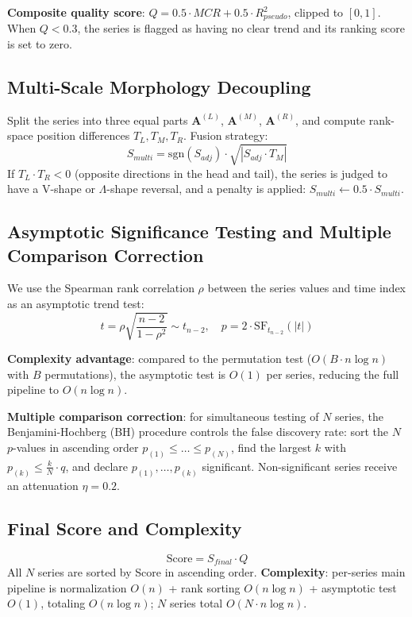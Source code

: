 \documentclass[11pt]{article}
\begin{document}
\textbf{Composite quality score}: $Q = 0.5 \cdot MCR + 0.5 \cdot R^2_{pseudo}$, clipped to $[0,1]$. When $Q < 0.3$, the series is flagged as having no clear trend and its ranking score is set to zero.

\subsection{Multi-Scale Morphology Decoupling}
Split the series into three equal parts $\mathbf{A}^{(L)}$, $\mathbf{A}^{(M)}$, $\mathbf{A}^{(R)}$, and compute rank-space position differences $T_L, T_M, T_R$. Fusion strategy:
\begin{equation}
S_{multi} = \text{sgn}(S_{adj}) \cdot \sqrt{|S_{adj} \cdot T_M|}
\end{equation}
If $T_L \cdot T_R < 0$ (opposite directions in the head and tail), the series is judged to have a V-shape or $\Lambda$-shape reversal, and a penalty is applied: $S_{multi} \leftarrow 0.5 \cdot S_{multi}$.

\subsection{Asymptotic Significance Testing and Multiple Comparison Correction}
We use the Spearman rank correlation $\rho$ between the series values and time index as an asymptotic trend test:
\begin{equation}
t = \rho \sqrt{\frac{n-2}{1-\rho^2}} \sim t_{n-2}, \quad p = 2 \cdot \text{SF}_{t_{n-2}}(|t|)
\end{equation}

\textbf{Complexity advantage}: compared to the permutation test ($O(B \cdot n \log n)$ with $B$ permutations), the asymptotic test is $O(1)$ per series, reducing the full pipeline to $O(n \log n)$.

\textbf{Multiple comparison correction}: for simultaneous testing of $N$ series, the Benjamini-Hochberg (BH) procedure controls the false discovery rate: sort the $N$ $p$-values in ascending order $p_{(1)} \le \dots \le p_{(N)}$, find the largest $k$ with $p_{(k)} \le \frac{k}{N} \cdot q$, and declare $p_{(1)}, \dots, p_{(k)}$ significant. Non-significant series receive an attenuation $\eta = 0.2$.

\subsection{Final Score and Complexity}
\begin{equation}
\text{Score} = S_{final} \cdot Q
\end{equation}
All $N$ series are sorted by Score in ascending order. \textbf{Complexity}: per-series main pipeline is normalization $O(n)$ + rank sorting $O(n \log n)$ + asymptotic test $O(1)$, totaling $O(n \log n)$; $N$ series total $O(N \cdot n \log n)$.
\end{document}
